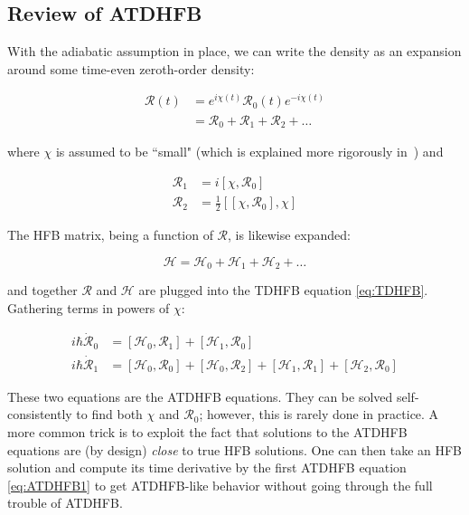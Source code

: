 \subsection{Review of ATDHFB}

With the adiabatic assumption in place, we can write the density as an expansion around some time-even zeroth-order density:

\begin{align}
\mathcal{R}(t) 
&= e^{i\chi(t)}\mathcal{R}_0(t)e^{-i\chi(t)} \\
&= \mathcal{R}_0 + \mathcal{R}_1 + \mathcal{R}_2 + \dots
\end{align}

\noindent where $\chi$ is assumed to be ``small" (which is explained more rigorously in~\cite{Baranger1978}) and

\begin{align}\label{eqn:densities1}
\mathcal{R}_1 &= i\left[\chi, \mathcal{R}_0\right] \\
\label{eqn:densities2}\mathcal{R}_2 &= \frac{1}{2}\left[\left[\chi, \mathcal{R}_0\right], \chi\right] 
\end{align}

\noindent The HFB matrix, being a function of $\mathcal{R}$, is likewise expanded:

\begin{equation}
\mathcal{H} = \mathcal{H}_0 + \mathcal{H}_1 + \mathcal{H}_2 + \dots
\end{equation}

\noindent and together $\mathcal{R}$ and $\mathcal{H}$ are plugged into the TDHFB equation \eqref{eq:TDHFB}. Gathering terms in powers of $\chi$:

\begin{align}
i\hbar\mathcal{\dot{R}}_0 &= \left[\mathcal{H}_0, \mathcal{R}_1\right] + \left[\mathcal{H}_1, \mathcal{R}_0\right] \label{eq:ATDHFB1}\\
i\hbar\mathcal{\dot{R}}_1 &= \left[\mathcal{H}_0, \mathcal{R}_0\right] + \left[\mathcal{H}_0, \mathcal{R}_2\right]
+ \left[\mathcal{H}_1, \mathcal{R}_1\right] + \left[\mathcal{H}_2, \mathcal{R}_0\right]
\end{align}

\noindent These two equations are the ATDHFB equations. They can be solved self-consistently to find both $\chi$ and $\mathcal{R}_0$; however, this is rarely done in practice. A more common trick is to exploit the fact that solutions to the ATDHFB equations are (by design) \textit{close} to true HFB solutions. One can then take an HFB solution and compute its time derivative by the first ATDHFB equation \eqref{eq:ATDHFB1} to get ATDHFB-like behavior without going through the full trouble of ATDHFB.

